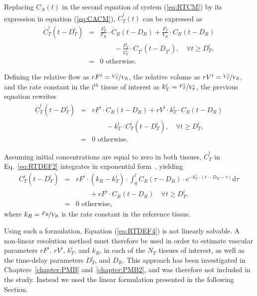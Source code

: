 Replacing $C_A(t)$ in the second equation of system (\ref{eq:RTCM}) by its expression in equation (\ref{eq:CACM}), $\dot{C}_T^i(t)$ can be expressed as
\begin{equation}
\begin{array}{rcl}
\dot{C}_T^i \left(t - D_T^i\right) &= & \frac{F_T^i}{F_{R}} \cdot \dot{C}_{R}\left(t-D_R\right) + \frac{F_T^i}{V_R} \cdot C_{R} \left(t - D_{R}\right)  \\
& & \qquad - \frac{F_T^i}{V_T^i} \cdot C_{T^i} \left(t - D_{T^i}\right), \quad \forall t \geq D_T^i,\\
&=& \textrm{0 otherwise.}
\end{array}
\label{eq:RTDEF1}
\end{equation}

Defining the relative flow as $rF^i = \nicefrac{V_T^i}{V_R}$, the relative volume as $rV^i = \nicefrac{V_T^i}{V_R}$, and the rate constant in the i$^{th}$ tissue of interest as $k_T^i = \nicefrac{F_T^i}{V_T^i}$, the previous equation rewrites
\begin{equation}
\begin{array}{rcl}
\dot{C}_T^i \left(t - D_T^i\right) &= & rF^i \cdot \dot{C}_{R}\left(t-D_R\right) + rV^i \cdot k_T^i \cdot C_{R} \left(t - D_{R}\right) \\
& & \qquad - k_T^i \cdot C_{T}^i \left( t - D_{T}^i \right), \quad \forall t \geq D_T^i,\\
&=& \textrm{0 otherwise.}
\end{array}
\label{eq:RTDEF2}
\end{equation}

Assuming initial concentrations are equal to zero in both tissues, $\dot{C}_T^i$ in Eq.~\ref{eq:RTDEF2} integrates in exponential form~\cite{Yankeelov2005de}, yielding
\begin{equation}
\begin{array}{rcl}
C_T^i \left( t - D_T^i \right) & = & rF^i \cdot \left( k_R - k_T^i \right) \cdot \int_{0}^{t} C_{R} \left( \tau - D_R \right) \cdot e^{- k_T^i \cdot \left( t - D_R - \tau \right)} \mathrm d \tau \\
& & \qquad + rF^i \cdot C_{R} \left( t - D_R \right) \quad \forall t \geq D_T^i, \\
&=& \textrm{0 otherwise,}
\end{array}
\label{eq:RTDEF4}
\end{equation}
where $k_R = \nicefrac{F_R}{V_R}$ is the rate constant in the reference tissue.

Using such a formulation, Equation (\ref{eq:RTDEF4}) is not linearly solvable. 
A non-linear resolution method must therefore be used in order to estimate vascular parameters $rF^i$, $rV^i$, $k_T^i$, and $k_R$, in each of the $N_T$ tissues of interest, as well as the time-delay parameters $D_T^i$, and $D_R$.
This approach has been investigated in Chapters~\ref{chapter:PMB} and~\ref{chapter:PMB2}, and was therefore not included in the study. 
Instead we used the linear formulation presented in the following Section.
\FloatBarrier

